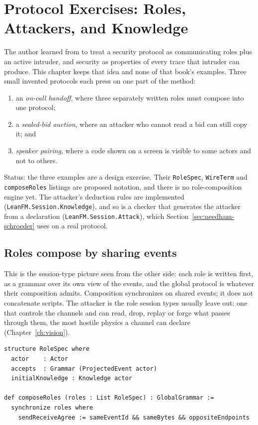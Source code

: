 \chapter{Protocol Exercises: Roles, Attackers, and Knowledge}
\label{ch:csp-exercises}

The author learned from \citet{ryan2001modelling} to treat a security protocol
as communicating roles plus an active intruder, and security as properties of
every trace that intruder can produce. This chapter keeps that idea and none of
that book's examples. Three small invented protocols each press on one part of
the method:

\begin{enumerate}
  \item an \emph{on-call handoff}, where three separately written roles must
        compose into one protocol;
  \item a \emph{sealed-bid auction}, where an attacker who cannot read a bid can
        still copy it; and
  \item \emph{speaker pairing}, where a code shown on a screen is visible to some
        actors and not to others.
\end{enumerate}

Status: the three examples are a design exercise. Their \texttt{RoleSpec},
\texttt{WireTerm} and \texttt{composeRoles} listings are proposed notation, and
there is no role-composition engine yet. The attacker's deduction rules are
implemented (\texttt{LeanFM.Session.Knowledge}), and so is a checker that
generates the attacker from a declaration (\texttt{LeanFM.Session.Attack}),
which Section~\ref{sec:needham-schroeder} uses on a real protocol.

\section{Roles compose by sharing events}

This is the session-type picture seen from the other side: each role is written
first, as a grammar over its own view of the events, and the global protocol is
whatever their composition admits. Composition synchronizes on shared events; it
does not concatenate scripts. The attacker is the role session types usually
leave out: one that controls the channels and can read, drop, replay or forge
what passes through them, the most hostile physics a channel can declare
(Chapter~\ref{ch:vision}).

\begin{lstlisting}
structure RoleSpec where
  actor    : Actor
  accepts  : Grammar (ProjectedEvent actor)
  initialKnowledge : Knowledge actor

def composeRoles (roles : List RoleSpec) : GlobalGrammar :=
  synchronize roles where
    sendReceiveAgree := sameEventId && sameBytes && oppositeEndpoints
\end{lstlisting}

